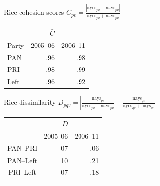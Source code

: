 \documentclass[bigger]{beamer}
\begin{document}
\begin{frame}[label={sec:org1faaed2}]{Rice cohesion scores}
\centering
\(C_{pv} = \frac{\left|\text{ayes}_{pv} - \text{nays}_{pv}\right|}{\text{ayes}_{pv} + \text{nays}_{pv}}\)
\bigskip
\begin{center}
\begin{tabular}{lrr}
 & \(\bar{C}\) & \\
Party & 2005--06 & 2006--11\\
\hline
PAN & .96 & .98\\
PRI & .98 & .99\\
Left & .96 & .92\\
\end{tabular}
\end{center}
\end{frame}
\begin{frame}[label={sec:orga06c044}]{Rice dissimilarity}
\centering
\(D_{pqv} = \left|\frac{\text{nays}_{pv}}{\text{ayes}_{pv} + \text{nays}_{pv}} - \frac{\text{nays}_{qv}}{\text{ayes}_{qv} + \text{nays}_{qv}}\right|\)

\bigskip
\begin{center}
\begin{tabular}{crr}
 & \(\bar{D}\) & \\
 & 2005--06 & 2006--11\\
\hline
PAN--PRI & .07 & \alert{.06}\\
PAN--Left & .10 & \alert{.21}\\
PRI--Left & .07 & \alert{.18}\\
 &  & \\
\end{tabular}
\end{center}
\end{frame}
\end{document}
